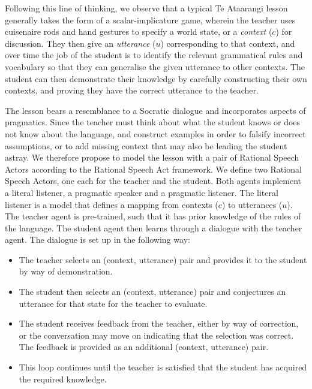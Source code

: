 Following this line of thinking, we observe that a typical Te Ataarangi lesson generally takes the form of a scalar-implicature game, wherein the teacher uses cuisenaire rods and hand gestures to specify a world state, or a \textit{context} ($c$) for discussion. They then give an \textit{utterance} ($u$) corresponding to that context, and over time the job of the student is to identify the relevant grammatical rules and vocabulary so that they can generalise the given utterance to other contexts. The student can then demonstrate their knowledge by carefully constructing their own contexts, and proving they have the correct utterance to the teacher.

The lesson bears a resemblance to a Socratic dialogue and incorporates aspects of pragmatics. Since the teacher must think about what the student knows or does not know about the language, and construct examples in order to falsify incorrect assumptions, or to add missing context that may also be leading the student astray. We therefore propose to model the lesson with a pair of Rational Speech Actors according to the Rational Speech Act \cite{frank2012predicting,goodman2016pragmatic} framework. We define two Rational Speech Actors, one each for the teacher and the student. Both agents implement a literal listener, a pragmatic speaker and a pragmatic listener. The literal listener is a model that defines a mapping from contexts ($c$) to utterances ($u$). The teacher agent is pre-trained, such that it has prior knowledge of the rules of the language. The student agent then learns through a dialogue with the teacher agent. The dialogue is set up in the following way:

\begin{itemize}
  \item The teacher selects an (context, utterance) pair and provides it to the student by way of demonstration.
  \item The student then selects an (context, utterance) pair and conjectures an utterance for that state for the teacher to evaluate.
  \item The student receives feedback from the teacher, either by way of correction, or the conversation may move on indicating that the selection was correct. The feedback is provided as an additional (context, utterance) pair.
  \item This loop continues until the teacher is satisfied that the student has acquired the required knowledge.
\end{itemize}


